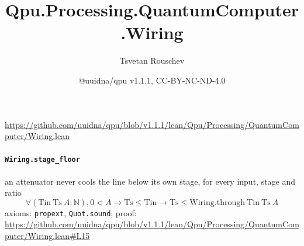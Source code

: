 \documentclass[11pt]{article}
\title{Qpu.Processing.QuantumComputer.Wiring}
\author{Tsvetan Rouschev}
\date{@uuidna/qpu v1.1.1, CC-BY-NC-ND-4.0}
\begin{document}
\maketitle
\noindent\url{https://github.com/uuidna/qpu/blob/v1.1.1/lean/Qpu/Processing/QuantumComputer/Wiring.lean}

\paragraph{\texttt{Wiring.stage\_floor}}
an attenuator never cools the line below its own stage, for every input, stage and ratio
\[ \forall (\mathrm{Tin}\ \mathrm{Ts}\ A : \mathbb{N}), 0 < A \to \mathrm{Ts} \le \mathrm{Tin} \to \mathrm{Ts} \le \mathrm{Wiring.through}\ \mathrm{Tin}\ \mathrm{Ts}\ A \]
\noindent axioms: \texttt{propext}, \texttt{Quot.sound}; proof: \url{https://github.com/uuidna/qpu/blob/v1.1.1/lean/Qpu/Processing/QuantumComputer/Wiring.lean\#L15}
\end{document}
